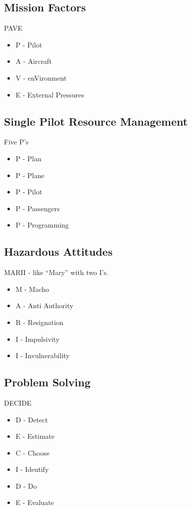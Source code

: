 \subsection{Mission Factors}

PAVE

\begin{itemize}
    \item P - Pilot
    \item A - Aircraft
    \item V - enVironment
    \item E - External Pressures
\end{itemize}

\subsection{Single Pilot Resource Management}

Five P's

\begin{itemize}
    \item P - Plan
    \item P - Plane
    \item P - Pilot
    \item P - Passengers
    \item P - Programming
\end{itemize}

\subsection{Hazardous Attitudes}

MARII - like ``Mary'' with two I's.

\begin{itemize}
    \item M - Macho
    \item A - Anti Authority
    \item R - Resignation
    \item I - Impulsivity
    \item I - Invulnerability
\end{itemize}

\subsection{Problem Solving}

DECIDE

\begin{itemize}
    \item D - Detect
    \item E - Estimate 
    \item C - Choose
    \item I - Identify
    \item D - Do
    \item E - Evaluate
\end{itemize}

